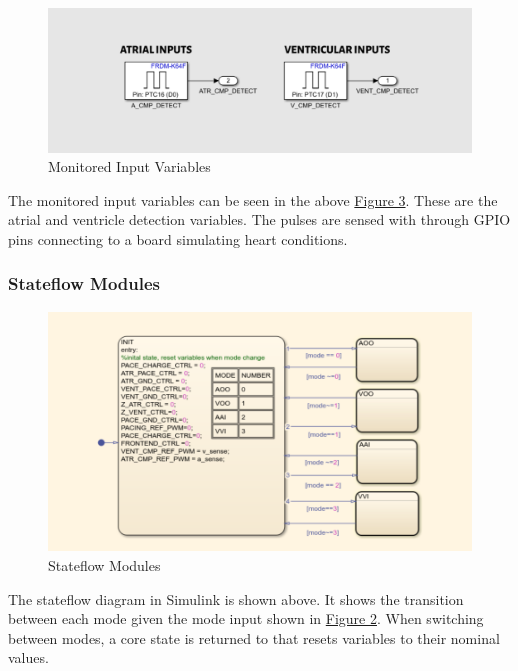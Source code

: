 \documentclass{article}
\begin{document}
\begin{tcolorbox}
    \begin{figure}[H]
        \includegraphics[width=\textwidth]{InMon.png}
        \caption{Monitored Input Variables}
        \label{InMon}
    \end{figure}
\end{tcolorbox}
The monitored input variables can be seen in the above \hyperref[InMon]{Figure 3}. These are the atrial and ventricle detection 
variables. The pulses are sensed with through GPIO pins connecting to a board simulating heart conditions. 

\newpage
\subsubsection{Stateflow Modules}
\begin{tcolorbox}
    \begin{figure}[H]
        \includegraphics[width=\textwidth]{StateMod.png}
        \caption{Stateflow Modules}
        \label{StateMod}
    \end{figure}
\end{tcolorbox}
The stateflow diagram in Simulink is shown above. It shows the transition between each mode given the mode input shown in 
\hyperref[ConstIn]{Figure 2}. When switching between modes, a core state is returned to that resets variables to their nominal values. 
\end{document}
